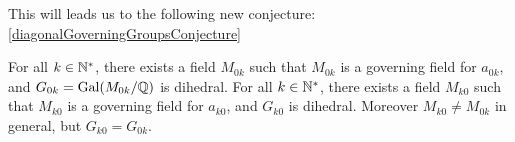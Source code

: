 This will leads us to the following new conjecture:
\ref{diagonalGoverningGroupsConjecture}
\begin{conjecture}
	For all $k \in \mathbb{N}^*$, there exists a field $M_{0k}$ such that $M_{0k}$ is a governing field for $a_{0k}$, and $G_{0k} = \text{Gal}(M_{0k}/\mathbb{Q})$ is dihedral.
	For all $k \in \mathbb{N}^*$, there exists a field $M_{k0}$ such that $M_{k0}$ is a governing field for $a_{k0}$, and $G_{k0}$ is dihedral.
	Moreover $M_{k0} \neq M_{0k}$ in general, but $G_{k0} = G_{0k}$.
\end{conjecture}
